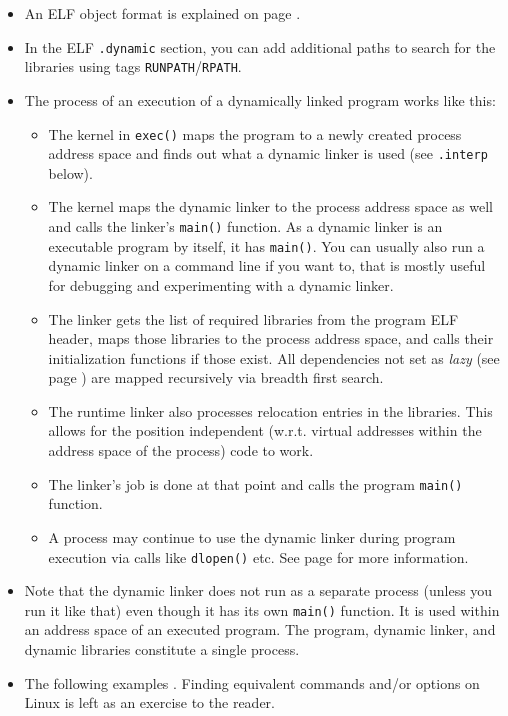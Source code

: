 \begin{itemize}
\item An ELF object format is explained on page \pageref{ELF}.
\item In the ELF \texttt{.dynamic} section, you can add additional paths to
search for the libraries using tags \texttt{RUNPATH}/\texttt{RPATH}.
\item The process of an execution of a dynamically linked program works like
this:
\begin{itemize}
\item The kernel in \texttt{exec()} maps the program to a newly created process
address space and finds out what a dynamic linker is used (see \texttt{.interp}
below).
\item The kernel maps the dynamic linker to the process address space as well
and calls the linker's \texttt{main()} function.  As a dynamic linker is an
executable program by itself, it has \texttt{main()}.  You can usually also run
a dynamic linker on a command line if you want to, that is mostly useful for
debugging and experimenting with a dynamic linker.
\item The linker gets the list of required libraries from the program ELF header,
maps those libraries to the process address space, and calls their initialization
functions if those exist.  All dependencies not set as
\emph{lazy} (see page \pageref{DLOPEN}) are mapped recursively via breadth
first search.
\item The runtime linker also processes relocation entries in the libraries.
This allows for the position independent (w.r.t. virtual addresses within the
address space of the process) code to work.
\item The linker's job is done at that point and calls the program
\texttt{main()} function.
\item A process may continue to use the dynamic linker during program execution
via calls like \texttt{dlopen()} etc.  See page \pageref{DLOPEN} for more
information.
\end{itemize}
\item Note that the dynamic linker does not run as a separate process (unless
you run it like that) even though it has its own \texttt{main()} function.
It is used within an address space of an executed program. The program, dynamic
linker, and dynamic libraries constitute a single process.
\item The following examples .  Finding equivalent
commands and/or options on Linux is left as an exercise to the reader.

\end{itemize}
